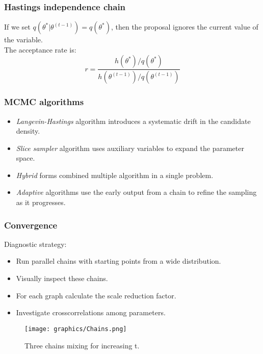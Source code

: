 \documentclass{beamer}
\newcommand{\1}{\ensuremath{\mathbf{1}}}
\begin{document}
%
%
%
\begin{frame}\frametitle{Hastings independence chain}
	If we set $q(\theta^*|\theta^{(t-1)}) = q(\theta^*)$, then the proposal ignores the current value of the variable.\\[2ex]
	The acceptance rate is:
	\begin{equation}
		r = \frac{h(\theta^*)/q(\theta^*)}{h(\theta^{(t-1)})/q(\theta^{(t-1)})}
	\end{equation}		
\end{frame}
%
%
%
\begin{frame}\frametitle{MCMC algorithms}
	\begin{itemize}
		\item \emph{Langevin-Hastings} algorithm introduces a systematic drift in the candidate density.
		\item \emph{Slice sampler} algorithm uses auxiliary variables to expand the parameter space.
		\item \emph{Hybrid} forms combined multiple algorithm in a single problem.
		\item \emph{Adaptive} algorithms use the early output from a chain to refine the sampling as it progresses.
	\end{itemize}
\end{frame}
%
%
%
\begin{frame}\frametitle{Convergence}
	Diagnostic strategy:
	\begin{itemize}
		\item Run parallel chains with starting points from a wide distribution.
		\item Visually inspect these chains.
		\item For each graph calculate the scale reduction factor.
		\item Investigate crosscorrelations among parameters.
	\end{itemize}
	\begin{figure}
	\begin{center}
		\texttt{[image: graphics/Chains.png]}
	\end{center}
	\caption{Three chains mixing for increasing t.}
	\end{figure}
\end{frame}
\end{document}
